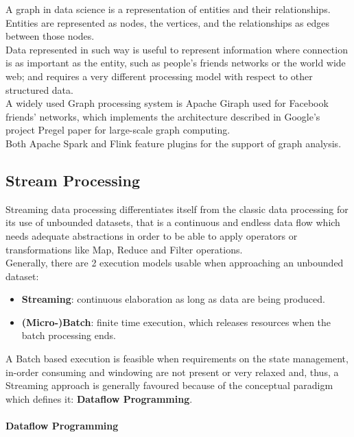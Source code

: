 A graph in data science is a representation of entities and their relationships.\newline
Entities are represented as nodes, the vertices, and the relationships as edges between those nodes.\newline
\\
Data represented in such way is useful to represent information where connection is as important as the entity, such as people's friends networks or the world wide web; and requires a very different processing model with respect to other structured data.\newline
\\
A widely used Graph processing system is Apache Giraph used for Facebook friends' networks, which implements the architecture described in Google's project Pregel paper for large-scale graph computing\cite{Malewicz:2010:PSL:1807167.1807184}.
\\
Both Apache Spark and Flink feature plugins for the support of graph analysis.

\subsection{Stream Processing} \label{StreamProc}

Streaming data processing differentiates itself from the classic data processing for its use of unbounded datasets, that is a continuous and endless data flow which needs adequate abstractions in order to be able to apply operators or transformations like Map, Reduce and Filter operations. \\ 

Generally, there are 2 execution models usable when approaching an unbounded dataset:

\begin{itemize}
    \item \textbf{Streaming}: continuous elaboration as long as data are being produced.
    \item \textbf{(Micro-)Batch}: finite time execution, which releases resources when the batch processing ends.
\end{itemize}

A Batch based execution is feasible when requirements on the state management, in-order consuming and windowing are not present or very relaxed and, thus, a Streaming approach is generally favoured because of the conceptual paradigm which defines it: \textbf{Dataflow Programming}.

\paragraph{Dataflow Programming}  \label{DataflowProg}

